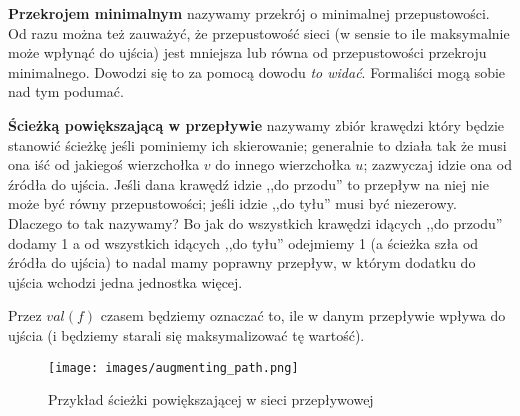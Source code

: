     
    \textbf{Przekrojem minimalnym} nazywamy przekrój o minimalnej przepustowości. Od razu można też zauważyć, że przepustowość sieci (w sensie to ile maksymalnie może wpłynąć do ujścia) jest mniejsza lub równa od przepustowości przekroju minimalnego. Dowodzi się to za pomocą dowodu \textit{to widać}. Formaliści mogą sobie nad tym podumać. 

    \textbf{Ścieżką powiększającą w przepływie} nazywamy zbiór krawędzi który będzie stanowić ścieżkę jeśli pominiemy ich skierowanie; generalnie to działa tak że musi ona iść od jakiegoś wierzchołka $v$ do innego wierzchołka $u$; zazwyczaj idzie ona od źródła do ujścia. Jeśli  dana krawędź idzie ,,do przodu'' to przepływ na niej nie może być równy przepustowości; jeśli idzie ,,do tyłu'' musi być niezerowy. Dlaczego to tak nazywamy? Bo jak do wszystkich krawędzi idących ,,do przodu'' dodamy 1 a od wszystkich idących ,,do tyłu'' odejmiemy 1 (a ścieżka szła od źródła do ujścia) to nadal mamy poprawny przepływ, w którym dodatku do ujścia wchodzi jedna jednostka więcej. 

    Przez $val(f)$ czasem będziemy oznaczać to, ile w danym przepływie wpływa do ujścia (i będziemy starali się maksymalizować tę wartość). 

    \begin{figure}[H]
        \centering
        \texttt{[image: images/augmenting\_path.png]}
        \caption{Przykład ścieżki powiększającej w sieci przepływowej}
    \end{figure}
    